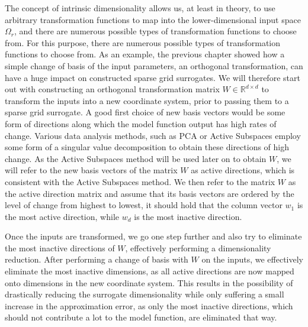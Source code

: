 \documentclass[
  a4paper,  %
  twoside,  %
  bibliography=totoc,
  headsepline,
  cleardoublepage=empty,
  parskip=half,
  draft=false
]{scrbook}
\begin{document}
The concept of intrinsic dimensionality allows us, at least in theory, to use arbitrary transformation functions to map into the lower-dimensional input space $\Omega_r$, and there are numerous possible types of transformation functions to choose from.
For this purpose, there are numerous possible types of transformation functions to choose from.
As an example, the previous chapter showed how a simple change of basis of the input parameters, \ie an orthogonal transformation, can have a huge impact on constructed sparse grid surrogates.
We will therefore start out with constructing an orthogonal transformation matrix $W \in \mathds{R}^{d \times d}$ to transform the inputs into a new coordinate system, prior to passing them to a sparse grid surrogate.
A good first choice of new basis vectors would be some form of directions along which the model function output has high rates of change.
Various data analysis methods, such as PCA \cite{Abdi2010} or Active Subspaces \cite{Constantine2015} employ some form of a singular value decomposition to obtain these directions of high change.
As the Active Subspaces method will be used later on to obtain $W$, we will refer to the new basis vectors of the matrix $W$ as active directions, which is consistent with the Active Subspaces method.
We then refer to the matrix $W$ as the active direction matrix and assume that its basis vectors are ordered by the level of change from highest to lowest, \ie it should hold that the column vector $w_1$ is the most active direction, while $w_d$ is the most inactive direction.

Once the inputs are transformed, we go one step further and also try to eliminate the most inactive directions of $W$, effectively performing a dimensionality reduction.
After performing a change of basis with $W$ on the inputs, we effectively eliminate the most inactive dimensions, as all active directions are now mapped onto dimensions in the new coordinate system.
This results in the possibility of drastically reducing the surrogate dimensionality while only suffering a small increase in the approximation error, as only the most inactive directions, which should not contribute a lot to the model function, are eliminated that way.
\end{document}
